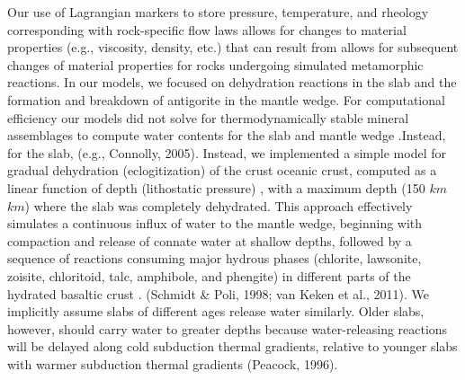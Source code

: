 \documentclass[draft,linenumbers]{agujournal2018} %
\providecommand{\DIFaddtex}[1]{{\protect\color{blue} \sf #1}} %
\providecommand{\DIFdeltex}[1]{{\protect\color{red} \scriptsize #1}} %
\providecommand{\DIFaddbegin}{} %
\providecommand{\DIFaddend}{} %
\providecommand{\DIFdelbegin}{} %
\providecommand{\DIFdelend}{} %
\providecommand{\DIFadd}[1]{\texorpdfstring{\DIFaddtex{#1}}{#1}} %
\providecommand{\DIFdel}[1]{\texorpdfstring{\DIFdeltex{#1}}{}} %
\newcommand{\DIFscaledelfig}{0.3}
\newlength{\DIFdelgraphicswidth} %
\newlength{\DIFdelgraphicsheight} %
\newcommand{\DIFaddincludegraphics}[2][]{{\color{blue}\fbox{\DIFOincludegraphics[#1]{#2}}}} %
\newcommand{\DIFdelincludegraphics}[2][]{%
\sbox{\DIFdelgraphicsbox}{\DIFOincludegraphics[#1]{#2}}%
\settoboxwidth{\DIFdelgraphicswidth}{\DIFdelgraphicsbox} %
\settoboxtotalheight{\DIFdelgraphicsheight}{\DIFdelgraphicsbox} %
\scalebox{\DIFscaledelfig}{%
\parbox[b]{\DIFdelgraphicswidth}{\usebox{\DIFdelgraphicsbox}\\[-\baselineskip] \rule{\DIFdelgraphicswidth}{0em}}\llap{\resizebox{\DIFdelgraphicswidth}{\DIFdelgraphicsheight}{%
\setlength{\unitlength}{\DIFdelgraphicswidth}%
\begin{picture}(1,1)%
\thicklines\linethickness{2pt} %
{\color[rgb]{1,0,0}\put(0,0){\framebox(1,1){}}}%
{\color[rgb]{1,0,0}\put(0,0){\line( 1,1){1}}}%
{\color[rgb]{1,0,0}\put(0,1){\line(1,-1){1}}}%
\end{picture}%
}\hspace*{3pt}}} %
} %
\DeclareRobustCommand{\DIFaddbegin}{\DIFOaddbegin \let\includegraphics\DIFaddincludegraphics} %
\DeclareRobustCommand{\DIFaddend}{\DIFOaddend \let\includegraphics\DIFOincludegraphics} %
\DeclareRobustCommand{\DIFdelbegin}{\DIFOdelbegin \let\includegraphics\DIFdelincludegraphics} %
\DeclareRobustCommand{\DIFdelend}{\DIFOaddend \let\includegraphics\DIFOincludegraphics} %
\begin{document}
\DIFaddend Our use of Lagrangian markers to store pressure, temperature, and
rheology \DIFdelbegin \DIFdel{corresponding with rock-specific flow laws allows for changes to material properties (e.g., viscosity, density, etc.) that can result from }\DIFdelend \DIFaddbegin \DIFadd{allows for subsequent changes of material properties for rocks
undergoing simulated }\DIFaddend metamorphic reactions. In our models, we focused on
dehydration reactions in the slab and the formation and breakdown of
antigorite in the mantle wedge. For computational efficiency our models
did not solve for thermodynamically stable mineral assemblages to
compute water contents for the slab and mantle wedge \DIFdelbegin %
\DIFdel{.Instead, for the slab,
}\DIFdelend \DIFaddbegin \DIFadd{(e.g., Connolly,
2005). Instead, }\DIFaddend we implemented a simple model for gradual dehydration
(eclogitization) of \DIFdelbegin \DIFdel{the crust}\DIFdelend \DIFaddbegin \DIFadd{oceanic crust, }\DIFaddend computed as a linear function of
depth (lithostatic pressure)\DIFaddbegin \DIFadd{, }\DIFaddend with a maximum depth (150 \DIFdelbegin \DIFdel{$km$}\DIFdelend \DIFaddbegin \DIFadd{\(km\)}\DIFaddend ) where
the slab was completely dehydrated. This approach effectively simulates
a continuous influx of water to the mantle wedge, beginning with
compaction and release of connate water at shallow depths, followed by a
sequence of reactions consuming major hydrous phases (chlorite,
lawsonite, zoisite, chloritoid, talc, amphibole, and phengite) in
different parts of the hydrated basaltic crust \DIFdelbegin %
\DIFdel{.}\DIFdelend \DIFaddbegin \DIFadd{(Schmidt \& Poli, 1998;
van Keken et al., 2011). We implicitly assume slabs of different ages
release water similarly. Older slabs, however, should carry water to
greater depths because water-releasing reactions will be delayed along
cold subduction thermal gradients, relative to younger slabs with warmer
subduction thermal gradients (Peacock, 1996).
}\DIFaddend
\end{document}
